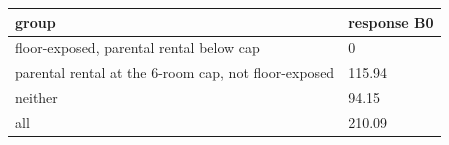 \begingroup\small
\setlength{\tabcolsep}{3pt}
\renewcommand{\arraystretch}{1.04}
\begin{tabularx}{\linewidth}{XX}
\toprule
group & response B0 \\
\midrule
floor-exposed, parental rental below cap & 0 \\
parental rental at the 6-room cap, not floor-exposed & 115.94 \\
neither & 94.15 \\
all & 210.09 \\
\bottomrule
\end{tabularx}
\endgroup
